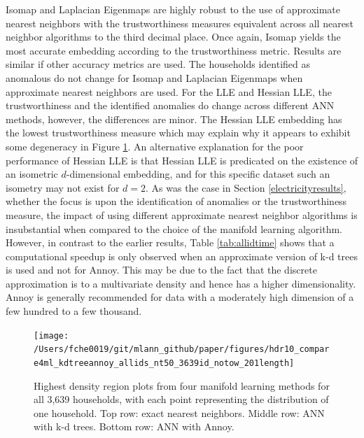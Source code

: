 \documentclass[12pt]{article}
\begin{document}
Isomap and Laplacian Eigenmaps are highly robust to the use of approximate nearest neighbors with the trustworthiness measures equivalent across all nearest neighbor algorithms to the third decimal place. Once again, Isomap yields the most accurate embedding according to the trustworthiness metric. Results are similar if other accuracy metrics are used. The households identified as anomalous do not change for Isomap and Laplacian Eigenmaps when approximate nearest neighbors are used. For the LLE and Hessian LLE, the trustworthiness and the identified anomalies do change across different ANN methods, however, the differences are minor. The Hessian LLE embedding has the lowest trustworthiness measure which may explain why it appears to exhibit some degeneracy in Figure \ref{fig:allidhdr}. An alternative explanation for the poor performance of Hessian LLE is that Hessian LLE is predicated on the existence of an isometric \(d\)-dimensional embedding, and for this specific dataset such an isometry may not exist for \(d=2\). As was the case in Section \ref{electricityresults}, whether the focus is upon the identification of anomalies or the trustworthiness measure, the impact of using different approximate nearest neighbor algorithms is insubstantial when compared to the choice of the manifold learning algorithm. However, in contrast to the earlier results, Table \ref{tab:allidtime} shows that a computational speedup is only observed when an approximate version of k-d trees is used and not for Annoy. This may be due to the fact that the discrete approximation is to a multivariate density and hence has a higher dimensionality. Annoy is generally recommended for data with a moderately high dimension of a few hundred to a few thousand.

\begin{figure}

{\centering \texttt{[image: /Users/fche0019/git/mlann\_github/paper/figures/hdr10\_compare4ml\_kdtreeannoy\_allids\_nt50\_3639id\_notow\_201length]} 

}

\caption{Highest density region plots from four manifold learning methods for all 3,639 households, with each point representing the distribution of one household. Top row: exact nearest neighbors. Middle row: ANN with k-d trees. Bottom row: ANN with Annoy.}\label{fig:allidhdr}
\end{figure}
\end{document}
